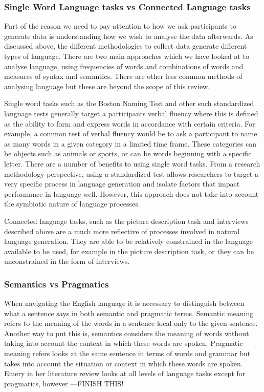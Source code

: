 \documentclass[12pt, twoside, a4paper]{article}
\begin{document}
\subsubsection{Single Word Language tasks vs Connected Language tasks}
Part of the reason we need to pay attention to how we ask participants to generate data is understanding how we wish to analyse the data afterwards. As discussed above, the different methodologies to collect data generate different types of language. There are two main approaches which we have looked at to analyse language, using frequencies of words and combinations of words and measures of syntax and semantics. There are other less common methods of analysing language but these are beyond the scope of this review.
\par
Single word tasks such as the Boston Naming Test and other such standardized language tests generally target a participants verbal fluency where this is defined as the ability to form and express words in accordance with certain criteria. For example, a common test of verbal fluency would be to ask a participant to name as many words in a given category in a limited time frame. These categories can be objects such as animals or sports, or can be words beginning with a specific letter. There are a number of benefits to using single word tasks. From a research methodology perspective, using a standardized test allows researchers to target a very specific process in language generation and isolate factors that impact performance in language well. However, this approach does not take into account the symbiotic nature of language processes.
\par
Connected language tasks, such as the picture description task and interviews described above are a much more reflective of processes involved in natural language generation. They are able to be relatively constrained in the language available to be used, for example in the picture description task, or they can be unconstrained in the form of interviews.
\par
\subsubsection{Semantics vs Pragmatics}
When navigating the English language it is necessary to distinguish between what a sentence says in both semantic and pragmatic terms. Semantic meaning refers to the meaning of the words in a sentence local only to the given sentence. Another way to put this is, semantics considers the meaning of words without taking into account the context in which these words are spoken. Pragmatic meaning refers looks at the same sentence in terms of words and grammar but takes into account the situation or context in which these words are spoken. Emery in her literature review looks at all levels of language tasks except for pragmatics, however ---FINISH THIS!
\par
\end{document}

